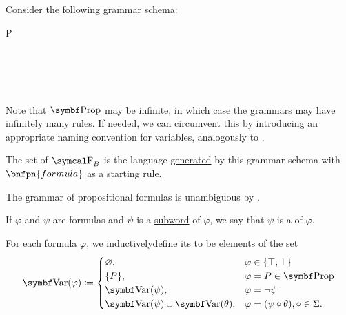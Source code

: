 \begin{definition}\label{def:propositional_language}\mbox{}
  \begin{DefEnum}
     Consider the following \hyperref[def:backus_naur_form]{grammar schema}:
    \begin{bnf*}
         {P \in {}} \\
       {\circ \in \Sigma} \\
          { \bnfor} \\
      \bnfmore             {\bnfts{\( \top \)} \bnfor \bnfts{\( \bot \)} \bnfor} \\
       \\
    \end{bnf*}

    Note that \( \Bold{Prop} \) may be infinite, in which case the grammars may have infinitely many rules. If needed, we can circumvent this by introducing an appropriate naming convention for variables, analogously to .

     The set of  \( \CF_B \) is the language \hyperref[def:grammar_derivation/grammar_language]{generated} by this grammar schema with \( \bnfpn{formula} \) as a starting rule.

    The grammar of propositional formulas is unambiguous by .

     If \( \varphi \) and \( \psi \) are formulas and \( \psi \) is a \hyperref[def:language/subword]{subword} of \( \varphi \), we say that \( \psi \) is a  of \( \varphi \).

     For each formula \( \varphi \), we inductively\IND define its  to be elements of the set
    \begin{equation}\label{def:propositional_language/var}
      \Bold{Var}(\varphi) \coloneqq \begin{cases}
        \varnothing,                              &\varphi \in \{ \top, \bot \}                     \\
        \{ P \},                                  &\varphi = P \in \Bold{Prop}                      \\
        \Bold{Var}(\psi),                         &\varphi = \neg \psi                              \\
        \Bold{Var}(\psi) \cup \Bold{Var}(\theta), &\varphi = (\psi \circ \theta), \circ \in \Sigma.
      \end{cases}
    \end{equation}
  \end{DefEnum}
\end{definition}

